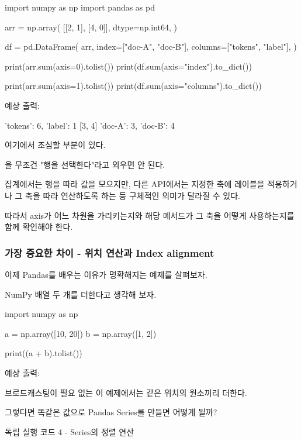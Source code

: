 \begin{dhkcode}
import numpy as np
import pandas as pd

arr = np.array(
    [[2, 1], [4, 0]],
    dtype=np.int64,
)

df = pd.DataFrame(
    arr,
    index=["doc-A", "doc-B"],
    columns=["tokens", "label"],
)

print(arr.sum(axis=0).tolist())
print(df.sum(axis="index").to_dict())

print(arr.sum(axis=1).tolist())
print(df.sum(axis="columns").to_dict())
\end{dhkcode}

예상 출력:

\begin{dhkzsh}
[6, 1]
{'tokens': 6, 'label': 1}
[3, 4]
{'doc-A': 3, 'doc-B': 4}
\end{dhkzsh}

여기에서 조심할 부분이 있다.

을 무조건 "행을 선택한다"라고 외우면 안 된다.

집계에서는 행을 따라 값을 모으지만, 다른 API에서는 지정한 축에 레이블을 적용하거나 그 축을 따라 연산하도록 하는 등 구체적인 의미가 달라질 수 있다.

따라서 axis가 어느 차원을 가리키는지와 해당 메서드가 그 축을 어떻게 사용하는지를 함께 확인해야 한다.

\subsubsection{가장 중요한 차이 - 위치 연산과 Index alignment}

이제 Pandas를 배우는 이유가 명확해지는 예제를 살펴보자.

NumPy 배열 두 개를 더한다고 생각해 보자.

\begin{dhkcode}
import numpy as np

a = np.array([10, 20])
b = np.array([1, 2])

print((a + b).tolist())
\end{dhkcode}

예상 출력:

\begin{dhkzsh}
[11, 22]
\end{dhkzsh}

브로드캐스팅이 필요 없는 이 예제에서는 같은 위치의 원소끼리 더한다.

그렇다면 똑같은 값으로 Pandas Series를 만들면 어떻게 될까?

\begin{dhknote}
\begin{dhksmry}[centered]
독립 실행 코드 4 - Series의 정렬 연산
\end{dhksmry}
\end{dhknote}


